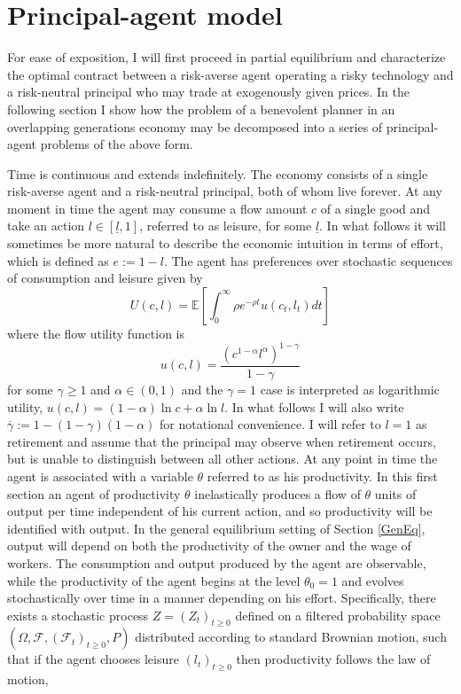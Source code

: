 \documentclass[11pt]{article}
\theoremstyle{plain}
\begin{document}
\section{Principal-agent model} \label{PriAg}

For ease of exposition, I will first proceed in partial equilibrium and characterize the optimal contract between a risk-averse agent operating a risky technology and a risk-neutral principal who may trade at exogenously given prices. In the following section I show how the problem of a benevolent planner in an overlapping generations economy may be decomposed into a series of principal-agent problems of the above form.


Time is continuous and extends indefinitely. The economy consists of a single risk-averse agent and a risk-neutral principal, both of whom live forever. At any moment in time the agent may consume a flow amount $c$ of a single good and take an action $l \in [\underline{l},1]$, referred to as leisure, for some $\underline{l}$. In what follows it will sometimes be more natural to describe the economic intuition in terms of effort, which is defined as $e := 1- l$. The agent has preferences over stochastic sequences of consumption and leisure given by
\begin{equation}
U(c,l) = \mathbb{E}{\left[\int_{0}^{\infty}\rho e^{-\rho t}u(c_t,l_t)dt\right]}
\label{prefagent}
\end{equation}
where the flow utility function is
\begin{equation}
u(c,l) = \frac{(c^{1-\alpha}l^{\alpha})^{1-\gamma}}{1-\gamma}
\label{flowutil2}
\end{equation}
for some $\gamma\geq1$ and $\alpha \in (0,1)$ and the $\gamma=1$ case is interpreted as logarithmic utility, $u(c,l) = (1-\alpha)\ln c+ \alpha\ln l$. In what follows I will also write $\overline{\gamma} := 1-(1-\gamma)(1-\alpha)$ for notational convenience. I will refer to $l = 1$ as retirement and assume that the principal may observe when retirement occurs, but is unable to distinguish between all other actions. At any point in time the agent is associated with a variable $\theta$ referred to as his productivity. In this first section an agent of productivity $\theta$ inelastically produces a flow of $\theta$ units of output per time independent of his current action, and so productivity will be identified with output. In the general equilibrium setting of Section \ref{GenEq}, output will depend on both the productivity of the owner and the wage of workers. The consumption and output produced by the agent are observable, while the productivity of the agent begins at the level $\theta_0=1$ and evolves stochastically over time in a manner depending on his effort. Specifically, there exists a stochastic process $Z = (Z_t)_{t\geq0}$ defined on a filtered probability space $(\Omega, \mathcal{F}, (\mathcal{F}_t)_{t\geq0},P)$ distributed according to standard Brownian motion, such that if the agent chooses leisure $(l_t)_{t\geq0}$ then productivity follows the law of motion, %
\end{document}
